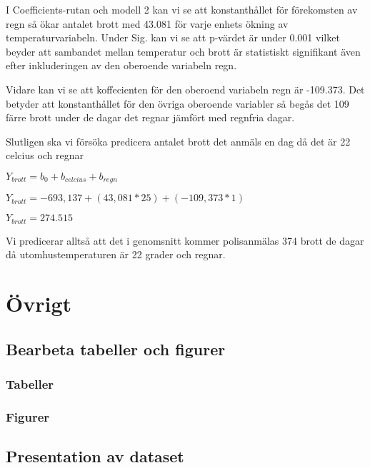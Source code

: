 \documentclass[
]{book}
\begin{document}
I Coefficients-rutan och modell 2 kan vi se att konstanthållet för förekomsten av regn så ökar antalet brott med 43.081 för varje enhets ökning av temperaturvariabeln. Under Sig. kan vi se att p-värdet är under 0.001 vilket beyder att sambandet mellan temperatur och brott är statistiskt signifikant även efter inkluderingen av den oberoende variabeln regn.

Vidare kan vi se att koffecienten för den oberoend variabeln regn är -109.373. Det betyder att konstanthållet för den övriga oberoende variabler så begås det 109 färre brott under de dagar det regnar jämfört med regnfria dagar.

Slutligen ska vi försöka predicera antalet brott det anmäls en dag då det är 22 celcius och regnar

\(Y_{brott} = b_0 + b_{celcius} + b_{regn}\)

\(Y_{brott} = -693,137 + (43,081*25) + (-109,373*1)\)

\(Y_{brott} = 274.515\)

Vi predicerar alltså att det i genomsnitt kommer polisanmälas 374 brott de dagar då utomhustemperaturen är 22 grader och regnar.

\hypertarget{part-uxf6vrigt}{%
\part*{Övrigt}\label{part-uxf6vrigt}}

\hypertarget{bearbeta-tabeller-och-figurer}{%
\chapter{Bearbeta tabeller och figurer}\label{bearbeta-tabeller-och-figurer}}

\hypertarget{tabeller}{%
\section{Tabeller}\label{tabeller}}

\hypertarget{figurer}{%
\section{Figurer}\label{figurer}}

\hypertarget{presentation-av-dataset}{%
\chapter{Presentation av dataset}\label{presentation-av-dataset}}
\end{document}
